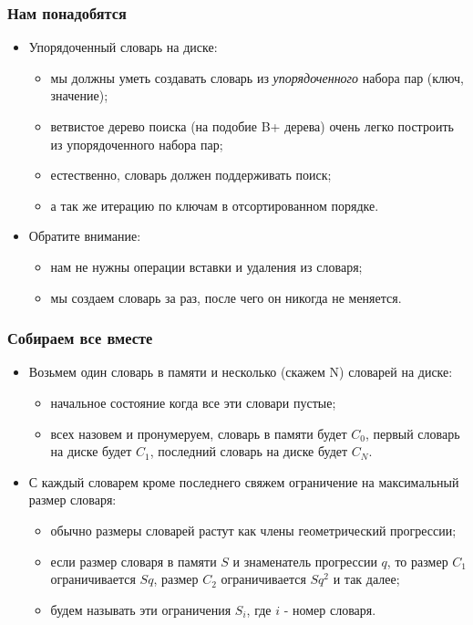 \begin{frame}
\frametitle{Нам понадобятся}
\begin{itemize}
  \item Упорядоченный словарь на диске:
  \begin{itemize}
    \item мы должны уметь создавать словарь из \emph{упорядоченного} набора
    пар (ключ, значение);
    \item ветвистое дерево поиска (на подобие B+ дерева) очень легко построить
    из упорядоченного набора пар;
    \item естественно, словарь должен поддерживать поиск;
    \item а так же итерацию по ключам в отсортированном порядке.
  \end{itemize}
  \item Обратите внимание:
  \begin{itemize}
    \item нам не нужны операции вставки и удаления из словаря;
    \item мы создаем словарь за раз, после чего он никогда не меняется.
  \end{itemize}
\end{itemize}
\end{frame}

\begin{frame}
\frametitle{Собираем все вместе}
\begin{itemize}
  \item Возьмем один словарь в памяти и несколько (скажем N) словарей на диске:
  \begin{itemize}
    \item начальное состояние когда все эти словари пустые;
    \item всех назовем и пронумеруем, словарь в памяти будет $C_0$, первый
    словарь на диске будет $C_1$, последний словарь на диске будет $C_N$.
  \end{itemize}
  \item С каждый словарем кроме последнего свяжем ограничение на максимальный
  размер словаря:
  \begin{itemize}
    \item обычно размеры словарей растут как члены геометрический прогрессии;
    \item если размер словаря в памяти $S$ и знаменатель прогрессии $q$, то
    размер $C_1$ ограничивается $Sq$, размер $C_2$ ограничивается $Sq^2$ и так
    далее;
    \item будем называть эти ограничения $S_i$, где $i$ - номер словаря.
  \end{itemize}
\end{itemize}
\end{frame}

